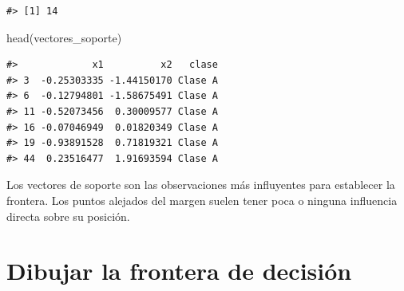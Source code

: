 \documentclass[
  spanish,
  10.5pt,
  letterpaper,
  openany,
  headings=big]{scrbook}
\newenvironment{Shaded}{}{}
\newcommand{\FunctionTok}[1]{\textcolor[rgb]{0.44,0.26,0.76}{#1}}
\newcommand{\NormalTok}[1]{\textcolor[rgb]{0.14,0.16,0.18}{#1}}
\begin{document}
\begin{verbatim}
#> [1] 14
\end{verbatim}

\begin{Shaded}
\begin{Highlighting}[]
\FunctionTok{head}\NormalTok{(vectores\_soporte)}
\end{Highlighting}
\end{Shaded}

\begin{verbatim}
#>             x1          x2   clase
#> 3  -0.25303335 -1.44150170 Clase A
#> 6  -0.12794801 -1.58675491 Clase A
#> 11 -0.52073456  0.30009577 Clase A
#> 16 -0.07046949  0.01820349 Clase A
#> 19 -0.93891528  0.71819321 Clase A
#> 44  0.23516477  1.91693594 Clase A
\end{verbatim}

\begin{tcolorbox}[enhanced jigsaw, arc=.35mm, bottomrule=.15mm, bottomtitle=1mm, breakable, colback=white, colbacktitle=quarto-callout-tip-color!10!white, colframe=quarto-callout-tip-color-frame, coltitle=black, left=2mm, leftrule=.75mm, opacityback=0, opacitybacktitle=0.6, rightrule=.15mm, title=\textcolor{quarto-callout-tip-color}{\faLightbulb}\hspace{0.5em}{Interpretación}, titlerule=0mm, toprule=.15mm, toptitle=1mm]

Los vectores de soporte son las observaciones más influyentes para
establecer la frontera. Los puntos alejados del margen suelen tener poca
o ninguna influencia directa sobre su posición.

\end{tcolorbox}

\section{Dibujar la frontera de
decisión}\label{dibujar-la-frontera-de-decisiuxf3n}
\end{document}
